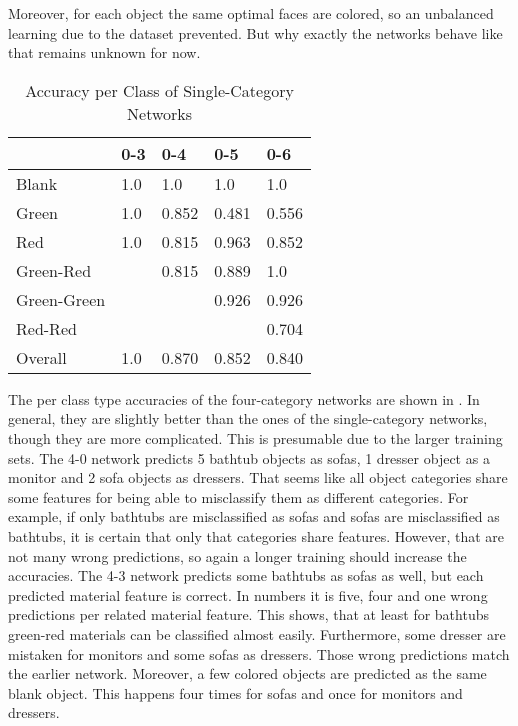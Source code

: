 Moreover, for each object the same optimal faces are colored, so an unbalanced learning due to the dataset prevented.
But why exactly the networks behave like that remains unknown for now. 
\begin{table}[]
	\centering
	\caption{Accuracy per Class of Single-Category Networks}
	\label{tab:single-category-accuracies}
	\begin{tabular}{l|llll}
		            & 0-3 & 0-4   & 0-5   & 0-6   \\ \hline
		Blank       & 1.0 & 1.0   & 1.0   & 1.0   \\
		Green       & 1.0 & 0.852 & 0.481 & 0.556 \\
		Red         & 1.0 & 0.815 & 0.963 & 0.852 \\
		Green-Red   &     & 0.815 & 0.889 & 1.0   \\
		Green-Green &     &       & 0.926 & 0.926 \\
		Red-Red     &     &       &       & 0.704 \\ \hline
		Overall		& 1.0 & 0.870 & 0.852 & 0.840 \\
	\end{tabular}
\end{table}
The per class type accuracies of the four-category networks are shown in .
In general, they are slightly better than the ones of the single-category networks, though they are more complicated.
This is presumable due to the larger training sets.
The 4-0 network predicts 5 bathtub objects as sofas, 1 dresser object as a monitor and 2 sofa objects as dressers.
That seems like all object categories share some features for being able to misclassify them as different categories.
For example, if only bathtubs are misclassified as sofas and sofas are misclassified as bathtubs, it is certain that only that categories share features.
However, that are not many wrong predictions, so again a longer training should increase the accuracies.
The 4-3 network predicts some bathtubs as sofas as well, but each predicted material feature is correct.
In numbers it is five, four and one wrong predictions per related material feature.
This shows, that at least for bathtubs green-red materials can be classified almost easily.
Furthermore, some dresser are mistaken for monitors and some sofas as dressers.
Those wrong predictions match the earlier network.
Moreover, a few colored objects are predicted as the same blank object.
This happens four times for sofas and once for monitors and dressers.
